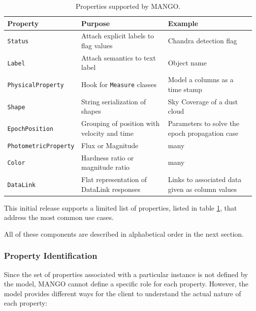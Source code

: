 \documentclass[11pt,a4paper]{ivoa}
\begin{document}
\begin{table}[h!]
\small
\begin{center}
\begin{tabular}{|| p{3.5cm} | p{3.5cm} |  p{3.5cm} ||} 
 \hline\hline
 \textbf{Property} & \textbf{Purpose} & \textbf{Example} \\ 
  \hline\hline
 \texttt{Status} & Attach explicit labels to flag values & Chandra detection flag  \\ 
 \hline
 \texttt{Label} & Attach semantics to text label & Object name \\
 \hline
 \texttt{PhysicalProperty} & Hook for \texttt{Measure} classes & Model a columns as a time stamp \\
 \hline
 \texttt{Shape} & String serialization of shapes & Sky Coverage of a dust cloud \\
 \hline
 \texttt{EpochPosition} & Grouping of position with velocity and time & Parameters to solve the epoch propagation case\\  
 \hline
 \texttt{PhotometricProperty} & Flux or Magnitude & many \\ 
 \hline
 \texttt{Color} & Hardness ratio or magnitude ratio & many  \\ [1ex] 
 \hline
 \texttt{DataLink} & Flat representation of DataLink responses & Links to associated data given as column values\\ [1ex] 
 \hline
\end{tabular}
\caption{Properties supported by MANGO.}
\label{table:properties}
\end{center}
 \end{table}
This initial release supports a limited list of properties, listed in table \ref{table:properties}, that address the most common use cases.



All of these components are described in alphabetical order in the next section.

\subsubsection{Property Identification}
Since the set of properties associated with a particular instance is not defined by the model,
MANGO cannot define a specific role for each property. However, the model provides different ways
for the client to understand the actual nature of each property:
\end{document}
